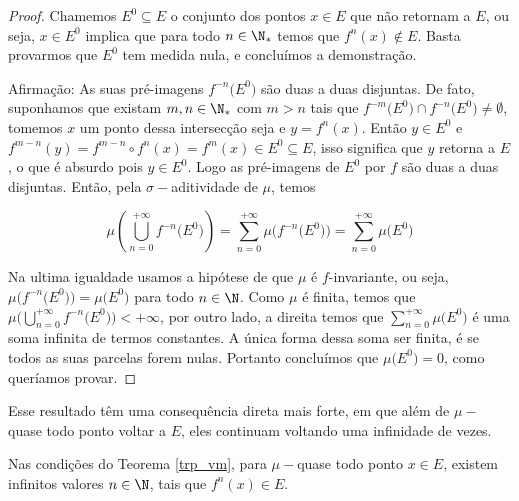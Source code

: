\begin{proof}
Chamemos $E^0\subseteq E$ o conjunto dos pontos $x\in E$ que não retornam a $E$, ou seja, $x\in E^0$ implica que para todo $n\in\N_{*}$ temos que $f^n(x)\notin E$. Basta provarmos que $E^0$ tem medida nula, e concluímos a demonstração. 

Afirmação: As suas pré-imagens $f^{-n}\big(E^0\big)$ são duas a duas disjuntas. De fato, suponhamos que existam $m,n\in\N_{*}$ com $m>n$ tais que $f^{-m}\big(E^0\big)\cap f^{-n}\big(E^0\big)\neq\emptyset$, tomemos $x$ um ponto dessa intersecção seja e $y=f^{n}(x)$. Então $y\in E^0$ e $f^{m-n}(y)=f^{m-n}\circ f^n(x)=f^{m}(x)\in E^0\subseteq E$, isso significa que $y$ retorna a $E$, o que é absurdo pois $y\in E^0$. Logo as pré-imagens de $E^0$ por $f$ são duas a duas disjuntas. Então, pela $\sigma-$aditividade de $\mu$, temos

\begin{equation*}
\mu\left(\bigcup_{n=0}^{+\infty}f^{-n}\big(E^0\big)\right)=\sum_{n=0}^{+\infty}\mu\Big(f^{-n}\big(E^0\big)\Big)=\sum_{n=0}^{+\infty}\mu\big(E^0\big)
\end{equation*}\vspace{0.1cm}

Na ultima igualdade usamos a hipótese de que $\mu$ é $f$-invariante, ou seja, $\mu\Big(f^{-n}\big(E^0\big)\Big)=\mu\big(E^0\big)$  para todo $n\in\N$. Como $\mu$ é finita, temos que $\mu\Big(\bigcup_{n=0}^{+\infty}f^{-n}\big(E^0\big)\Big)<+\infty$, por outro lado, a direita temos que $\sum_{n=0}^{+\infty}\mu\big(E^0\big)$ é uma soma infinita de termos constantes. A única forma dessa soma ser finita, é se todos as suas parcelas forem nulas. Portanto concluímos que $\mu\big(E^0\big)=0$, como queríamos provar. 
\end{proof}

Esse resultado têm uma consequência direta mais forte, em que além de $\mu-$ quase todo ponto voltar a $E$, eles continuam voltando uma infinidade de vezes.

\begin{corolario}
Nas condições do Teorema \ref{trp_vm}, para $\mu-$quase todo ponto $x\in E$, existem infinitos valores $n\in\N$, tais que $f^{n}(x)\in E$.
\end{corolario}

